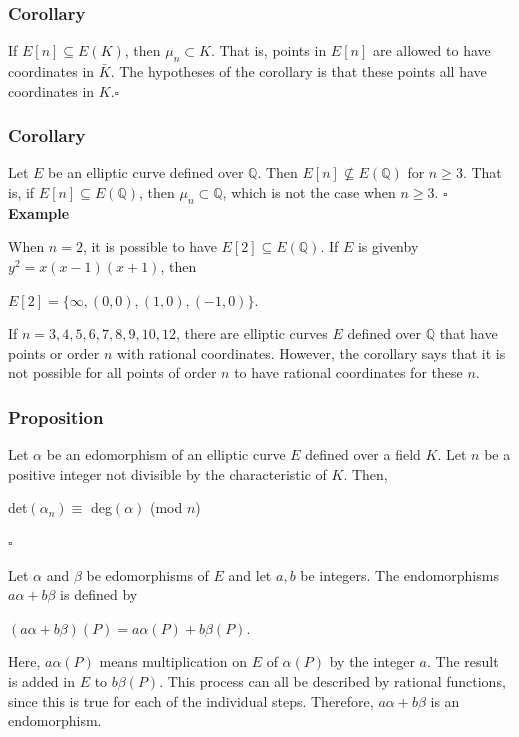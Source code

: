 \documentclass[a4paper, 12pt]{article}
\begin{document}
\subsubsection{Corollary}
If $E[n] \subseteq E(K)$, then $\mu_n \subset K$. \newline
That is, points in $E[n]$ are allowed to have coordinates in $\bar{K}$. The hypotheses of the corollary is that these points all have coordinates in $K$.$\square$
\subsubsection{Corollary}
Let $E$ be an elliptic curve defined over $\mathbb{Q}$. Then $E[n] \nsubseteq E(\mathbb{Q})$ for $n \geq 3$.\newline
That is, if $E[n] \subseteq E(\mathbb{Q})$, then $\mu_n \subset \mathbb{Q}$, which is not the case when $n \geq 3$. $\square$
\textbf{Example} \par
When $n=2$, it is possible to have $E[2] \subseteq E(\mathbb{Q})$. If $E$ is givenby $y^2=x(x-1)(x+1)$, then
\begin{center} $E[2] = \{\infty, (0,0),(1,0),(-1,0)\}$. \end{center}
If $n=3,4,5,6,7,8,9,10,12$, there are elliptic curves $E$ defined over $\mathbb{Q}$ that have points or order $n$ with rational coordinates. However, the corollary says that it is not possible for all points of order $n$ to have rational coordinates for these $n$.
\subsubsection{Proposition}
Let $\alpha$ be an edomorphism of an elliptic curve $E$ defined over a field $K$. Let $n$ be a positive integer not divisible by the characteristic of $K$. Then,
\begin{center} det$(\alpha_n) \equiv$ deg$(\alpha)$ (mod $n$) \end{center} $\square$\par
Let $\alpha$ and $\beta$ be edomorphisms of $E$ and let $a, b$ be integers. The endomorphisms $a\alpha + b\beta$ is defined by
\begin{center} $(a\alpha+b\beta)(P) = a\alpha(P)+b\beta(P).$ \end{center}
Here, $a\alpha(P)$ means multiplication on $E$ of $\alpha(P)$ by the integer $a$. The result is added in $E$ to $b\beta(P)$. This process can all be described by rational functions, since this is true for each of the individual steps. Therefore, $a\alpha+b\beta$ is an endomorphism.\par
\end{document}
